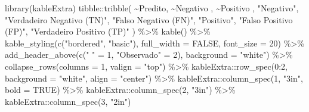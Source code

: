 \documentclass[
  letterpaper,
  DIV=11,
  numbers=noendperiod]{scrreprt}
\newenvironment{Shaded}{\begin{snugshade}}{\end{snugshade}}
\newcommand{\AttributeTok}[1]{\textcolor[rgb]{0.40,0.45,0.13}{#1}}
\newcommand{\ConstantTok}[1]{\textcolor[rgb]{0.56,0.35,0.01}{#1}}
\newcommand{\DecValTok}[1]{\textcolor[rgb]{0.68,0.00,0.00}{#1}}
\newcommand{\FunctionTok}[1]{\textcolor[rgb]{0.28,0.35,0.67}{#1}}
\newcommand{\NormalTok}[1]{\textcolor[rgb]{0.00,0.23,0.31}{#1}}
\newcommand{\OtherTok}[1]{\textcolor[rgb]{0.00,0.23,0.31}{#1}}
\newcommand{\SpecialCharTok}[1]{\textcolor[rgb]{0.37,0.37,0.37}{#1}}
\newcommand{\StringTok}[1]{\textcolor[rgb]{0.13,0.47,0.30}{#1}}
\begin{document}
\begin{Shaded}
\begin{Highlighting}[]
\FunctionTok{library}\NormalTok{(kableExtra)}
\NormalTok{tibble}\SpecialCharTok{::}\FunctionTok{tribble}\NormalTok{(}
  \SpecialCharTok{\textasciitilde{}}\NormalTok{Predito, }\SpecialCharTok{\textasciitilde{}}\StringTok{\textasciigrave{}}\AttributeTok{Negativo     }\StringTok{\textasciigrave{}}\NormalTok{, }\SpecialCharTok{\textasciitilde{}}\StringTok{\textasciigrave{}}\AttributeTok{Positivo }\StringTok{\textasciigrave{}}\NormalTok{,}
  \StringTok{"Negativo"}\NormalTok{,    }\StringTok{"Verdadeiro Negativo (TN)"}\NormalTok{, }\StringTok{"Falso Negativo (FN)"}\NormalTok{,}
  \StringTok{"Positivo"}\NormalTok{,    }\StringTok{"Falso Positivo (FP)"}\NormalTok{, }\StringTok{"Verdadeiro Positivo (TP)"}
\NormalTok{) }\SpecialCharTok{\%\textgreater{}\%}
  \FunctionTok{kable}\NormalTok{() }\SpecialCharTok{\%\textgreater{}\%}
  \FunctionTok{kable\_styling}\NormalTok{(}\FunctionTok{c}\NormalTok{(}\StringTok{"bordered"}\NormalTok{, }\StringTok{"basic"}\NormalTok{), }\AttributeTok{full\_width =} \ConstantTok{FALSE}\NormalTok{, }\AttributeTok{font\_size =} \DecValTok{20}\NormalTok{) }\SpecialCharTok{\%\textgreater{}\%}
  \FunctionTok{add\_header\_above}\NormalTok{(}\FunctionTok{c}\NormalTok{(}\StringTok{" "} \OtherTok{=} \DecValTok{1}\NormalTok{, }\StringTok{"Observado"} \OtherTok{=} \DecValTok{2}\NormalTok{), }\AttributeTok{background =} \StringTok{"white"}\NormalTok{) }\SpecialCharTok{\%\textgreater{}\%}
  \FunctionTok{collapse\_rows}\NormalTok{(}\AttributeTok{columns =} \DecValTok{1}\NormalTok{, }\AttributeTok{valign =} \StringTok{"top"}\NormalTok{) }\SpecialCharTok{\%\textgreater{}\%}
\NormalTok{  kableExtra}\SpecialCharTok{::}\FunctionTok{row\_spec}\NormalTok{(}\DecValTok{0}\SpecialCharTok{:}\DecValTok{2}\NormalTok{, }\AttributeTok{background =} \StringTok{"white"}\NormalTok{, }\AttributeTok{align =} \StringTok{"center"}\NormalTok{) }\SpecialCharTok{\%\textgreater{}\%}
\NormalTok{  kableExtra}\SpecialCharTok{::}\FunctionTok{column\_spec}\NormalTok{(}\DecValTok{1}\NormalTok{, }\StringTok{"3in"}\NormalTok{, }\AttributeTok{bold =} \ConstantTok{TRUE}\NormalTok{) }\SpecialCharTok{\%\textgreater{}\%}
\NormalTok{  kableExtra}\SpecialCharTok{::}\FunctionTok{column\_spec}\NormalTok{(}\DecValTok{2}\NormalTok{, }\StringTok{"3in"}\NormalTok{) }\SpecialCharTok{\%\textgreater{}\%}
\NormalTok{  kableExtra}\SpecialCharTok{::}\FunctionTok{column\_spec}\NormalTok{(}\DecValTok{3}\NormalTok{, }\StringTok{"2in"}\NormalTok{)}
\end{Highlighting}
\end{Shaded}
\end{document}
